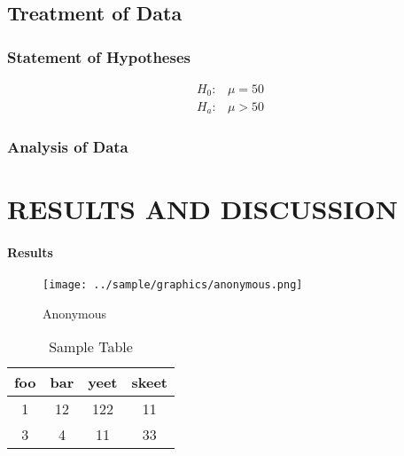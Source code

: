 \documentclass{strrespaper-trad}
\begin{document}
	    \subsection{Treatment of Data}
	        \subsubsection{Statement of Hypotheses} \vspace{-2em}
	            \begin{align*}
	                H_0: & \mu = 50 \\
	                H_a: & \mu > 50
	            \end{align*}
	        \subsubsection{Analysis of Data}
	            \lipsum[4]

    \section{RESULTS AND DISCUSSION}
	    \paragraph{Results}
	        \lipsum[13]
	        \begin{figure}[ht]
	            \centering
	            \texttt{[image: ../sample/graphics/anonymous.png]}
	            \caption[Anonymous]{Anonymous}
	            \label{fig:anonymous}
	        \end{figure}

	        \lipsum[15]

	        \begin{table}[ht]
	            \centering
	            \caption[Sample Table]{Sample Table}
	            \begin{tabular}{cccc}
	                \toprule
	                foo & bar & yeet & skeet \\
	                \midrule
	                1   & 12  & 122  & 11    \\
	                3   & 4   & 11   & 33    \\
	                \bottomrule
	            \end{tabular}
	            \label{tab:sampletable}
	        \end{table}

	        \lipsum[14]
\end{document}
